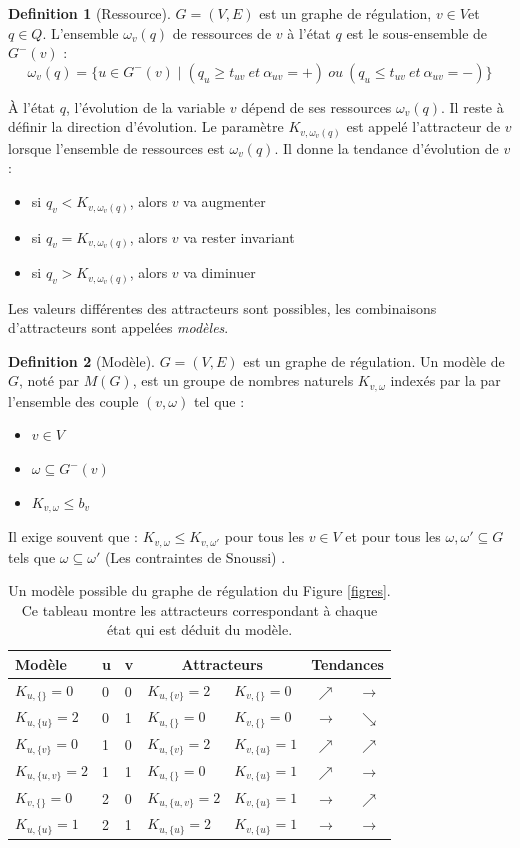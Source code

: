 \documentclass[11pt]{report}
\theoremstyle{definition}
\newtheorem{Def}{Definition}[chapter]
\begin{document}
\begin{Def}[Ressource]
$G=(V,E)$ est un graphe de r\'egulation, $v\in V$et $q\in Q$. L'ensemble $\omega_v(q)$ de ressources de $v$ \`a l'\'etat $q$ est le sous-ensemble de $G^-(v)$ :
$$\omega_v(q)=\{u\in G^-(v)\mid(q_u\geq t_{uv}\ et\ \alpha_{uv}=+)\ ou\ (q_u\leq t_{uv}\ et\ \alpha_{uv}=-)\}$$
\end{Def}
\`A l'\'etat $q$, l'\'evolution de la variable $v$ d\'epend de ses ressources $\omega_v(q)$. Il reste \`a d\'efinir la direction d'\'evolution. Le param\`etre $K_{v,\omega_v(q)}$ est appel\'e l'attracteur de $v$ lorsque l'ensemble de ressources est $\omega_v(q)$. Il donne la tendance d'\'evolution de $v$:
\begin{itemize}
\item si $q_v<K_{v,\omega_v(q)}$, alors $v$ va augmenter
\item si $q_v=K_{v,\omega_v(q)}$, alors $v$ va rester invariant
\item si $q_v>K_{v,\omega_v(q)}$, alors $v$ va diminuer
\end{itemize}
Les valeurs diff\'erentes des attracteurs sont possibles, les combinaisons d'attracteurs sont appel\'ees \textit{mod\`eles}.
\begin{Def}[Mod\`ele]
$G=(V,E)$ est un graphe de r\'egulation. Un mod\`ele de $G$, not\'e par $M(G)$, est un groupe de nombres naturels $K_{v,\omega}$ index\'es par la par l'ensemble des couple $(v,\omega)$ tel que :
\begin{itemize}
\item $v\in V$
\item $\omega \subseteq G^-(v)$
\item $K_{v,\omega}\leq b_v$ 
\end{itemize}
\end{Def}
Il exige souvent que :
$K_{v,\omega} \leq K_{v,\omega'}$ pour tous les $v\in V$ et pour tous les $\omega, \omega'\subseteq G$ tels que $\omega\subseteq\omega'$ (Les contraintes de Snoussi) \citep{Richard2006}. 

\begin{table}[ht]\large
\centering
\begin{tabular}{l|l l|l l|c c}
Mod\`ele & u & v &\multicolumn{2}{|c|}{Attracteurs}&\multicolumn{2}{|c}{Tendances}\\
\hline
$K_{u,\{\}}=0$&0&0&$K_{u,\{v\}}=2$&$K_{v,\{\}}=0$&$\nearrow$&$\to$\\
$K_{u,\{u\}}=2$&0&1&$K_{u,\{\}}=0$&$K_{v,\{\}}=0$&$\to$&$\searrow$\\
$K_{u,\{v\}}=0$&1&0&$K_{u,\{v\}}=2$&$K_{v,\{u\}}=1$&$\nearrow$&$\nearrow$\\
$K_{u,\{u,v\}}=2$&1&1&$K_{u,\{\}}=0$&$K_{v,\{u\}}=1$&$\nearrow$&$\to$\\
$K_{v,\{\}}=0$&2&0&$K_{u,\{u,v\}}=2$&$K_{v,\{u\}}=1$&$\to$&$\nearrow$\\
$K_{u,\{u\}}=1$&2&1&$K_{u,\{u\}}=2$&$K_{v,\{u\}}=1$&$\to$&$\to$
\end{tabular}
\caption{Un mod\`ele possible du graphe de r\'egulation du Figure \ref{figres}. Ce tableau montre les attracteurs correspondant \`a chaque \'etat qui est d\'eduit du mod\`ele.}\label{tab1}
\end{table}
\end{document}
